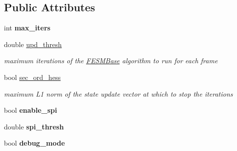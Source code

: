 \subsection*{Public Attributes}
\begin{DoxyCompactItemize}
\item 
\hypertarget{structFESMParams_a96be401b3db2c1b55143dffb8291be20}{int {\bfseries max\-\_\-iters}}\label{structFESMParams_a96be401b3db2c1b55143dffb8291be20}

\item 
\hypertarget{structFESMParams_ad0054f4f49459341a77c51bdce6989d6}{double \hyperlink{structFESMParams_ad0054f4f49459341a77c51bdce6989d6}{upd\-\_\-thresh}}\label{structFESMParams_ad0054f4f49459341a77c51bdce6989d6}

\begin{DoxyCompactList}\small\item\em maximum iterations of the \hyperlink{classFESMBase}{F\-E\-S\-M\-Base} algorithm to run for each frame \end{DoxyCompactList}\item 
\hypertarget{structFESMParams_a24f6ba0bf9d418d9ced7c04f3b4db32a}{bool \hyperlink{structFESMParams_a24f6ba0bf9d418d9ced7c04f3b4db32a}{sec\-\_\-ord\-\_\-hess}}\label{structFESMParams_a24f6ba0bf9d418d9ced7c04f3b4db32a}

\begin{DoxyCompactList}\small\item\em maximum L1 norm of the state update vector at which to stop the iterations \end{DoxyCompactList}\item 
\hypertarget{structFESMParams_a8ade0f5732bcc69614c95898aa2147ad}{bool {\bfseries enable\-\_\-spi}}\label{structFESMParams_a8ade0f5732bcc69614c95898aa2147ad}

\item 
\hypertarget{structFESMParams_a9fadb0002e1632b1c11f302bfd4d6f3a}{double {\bfseries spi\-\_\-thresh}}\label{structFESMParams_a9fadb0002e1632b1c11f302bfd4d6f3a}

\item 
\hypertarget{structFESMParams_a1598fce243fc405685aa6780056ef7f3}{bool {\bfseries debug\-\_\-mode}}\label{structFESMParams_a1598fce243fc405685aa6780056ef7f3}

\end{DoxyCompactItemize}


